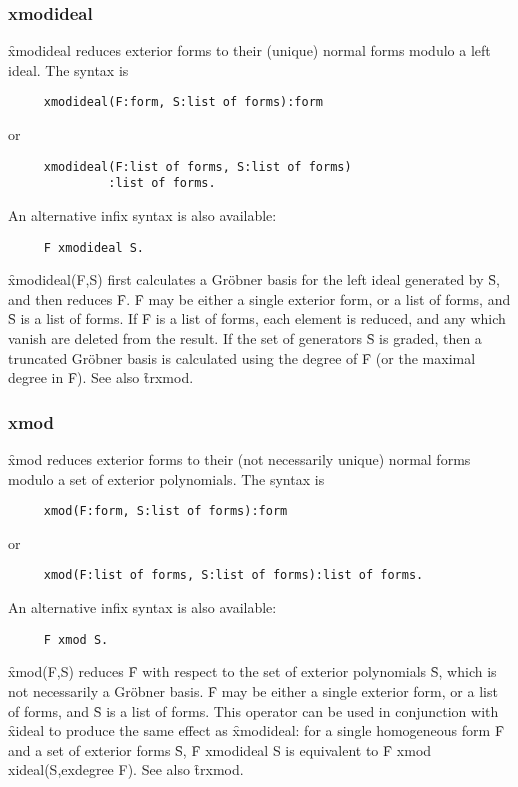 \subsubsection*{xmodideal}

\f{xmodideal} reduces exterior forms to their (unique) normal forms modulo
a left ideal. The syntax is
\begin{verbatim}
     xmodideal(F:form, S:list of forms):form
\end{verbatim}
or
\begin{verbatim}
     xmodideal(F:list of forms, S:list of forms)
              :list of forms.
\end{verbatim}
An alternative infix syntax is also available:
\begin{verbatim}
     F xmodideal S.
\end{verbatim}
\f{xmodideal(F,S)} first calculates a Gr{\"o}bner basis for the left ideal
generated by \f{S}, and then reduces \f{F}. \f{F} may be either a single
exterior form, or a list of forms, and \f{S} is a list of forms. If \f{F}
is a list of forms, each element is reduced, and any which vanish are
deleted from the result. 
If the set of generators \f{S} is graded, then a truncated Gr{\"o}bner basis
is calculated using the degree of \f{F} (or the maximal degree in
\f{F}). See also \f{trxmod}.


\subsubsection*{xmod}

\f{xmod} reduces exterior forms to their (not necessarily unique) normal
forms modulo a set of exterior polynomials. The syntax is
\begin{verbatim}
     xmod(F:form, S:list of forms):form
\end{verbatim}
or
\begin{verbatim}
     xmod(F:list of forms, S:list of forms):list of forms.
\end{verbatim}
An alternative infix syntax is also available:
\begin{verbatim}
     F xmod S.
\end{verbatim}
\f{xmod(F,S)} reduces \f{F} with respect to the set of exterior polynomials
\f{S}, which is not necessarily a Gr{\"o}bner basis. \f{F} may be either a
single exterior form, or a list of forms, and \f{S} is a list of
forms. This operator can be used in conjunction with \f{xideal} to produce
the same effect as \f{xmodideal}: for a single homogeneous form \f{F} and a
set of exterior forms \f{S}, \f{F xmodideal S} is equivalent to \f{F xmod
xideal(S,exdegree F)}. See also \f{trxmod}.


